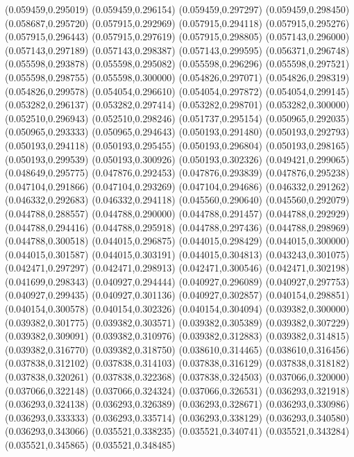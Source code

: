 (0.059459,0.295019)
(0.059459,0.296154)
(0.059459,0.297297)
(0.059459,0.298450)
(0.058687,0.295720)
(0.057915,0.292969)
(0.057915,0.294118)
(0.057915,0.295276)
(0.057915,0.296443)
(0.057915,0.297619)
(0.057915,0.298805)
(0.057143,0.296000)
(0.057143,0.297189)
(0.057143,0.298387)
(0.057143,0.299595)
(0.056371,0.296748)
(0.055598,0.293878)
(0.055598,0.295082)
(0.055598,0.296296)
(0.055598,0.297521)
(0.055598,0.298755)
(0.055598,0.300000)
(0.054826,0.297071)
(0.054826,0.298319)
(0.054826,0.299578)
(0.054054,0.296610)
(0.054054,0.297872)
(0.054054,0.299145)
(0.053282,0.296137)
(0.053282,0.297414)
(0.053282,0.298701)
(0.053282,0.300000)
(0.052510,0.296943)
(0.052510,0.298246)
(0.051737,0.295154)
(0.050965,0.292035)
(0.050965,0.293333)
(0.050965,0.294643)
(0.050193,0.291480)
(0.050193,0.292793)
(0.050193,0.294118)
(0.050193,0.295455)
(0.050193,0.296804)
(0.050193,0.298165)
(0.050193,0.299539)
(0.050193,0.300926)
(0.050193,0.302326)
(0.049421,0.299065)
(0.048649,0.295775)
(0.047876,0.292453)
(0.047876,0.293839)
(0.047876,0.295238)
(0.047104,0.291866)
(0.047104,0.293269)
(0.047104,0.294686)
(0.046332,0.291262)
(0.046332,0.292683)
(0.046332,0.294118)
(0.045560,0.290640)
(0.045560,0.292079)
(0.044788,0.288557)
(0.044788,0.290000)
(0.044788,0.291457)
(0.044788,0.292929)
(0.044788,0.294416)
(0.044788,0.295918)
(0.044788,0.297436)
(0.044788,0.298969)
(0.044788,0.300518)
(0.044015,0.296875)
(0.044015,0.298429)
(0.044015,0.300000)
(0.044015,0.301587)
(0.044015,0.303191)
(0.044015,0.304813)
(0.043243,0.301075)
(0.042471,0.297297)
(0.042471,0.298913)
(0.042471,0.300546)
(0.042471,0.302198)
(0.041699,0.298343)
(0.040927,0.294444)
(0.040927,0.296089)
(0.040927,0.297753)
(0.040927,0.299435)
(0.040927,0.301136)
(0.040927,0.302857)
(0.040154,0.298851)
(0.040154,0.300578)
(0.040154,0.302326)
(0.040154,0.304094)
(0.039382,0.300000)
(0.039382,0.301775)
(0.039382,0.303571)
(0.039382,0.305389)
(0.039382,0.307229)
(0.039382,0.309091)
(0.039382,0.310976)
(0.039382,0.312883)
(0.039382,0.314815)
(0.039382,0.316770)
(0.039382,0.318750)
(0.038610,0.314465)
(0.038610,0.316456)
(0.037838,0.312102)
(0.037838,0.314103)
(0.037838,0.316129)
(0.037838,0.318182)
(0.037838,0.320261)
(0.037838,0.322368)
(0.037838,0.324503)
(0.037066,0.320000)
(0.037066,0.322148)
(0.037066,0.324324)
(0.037066,0.326531)
(0.036293,0.321918)
(0.036293,0.324138)
(0.036293,0.326389)
(0.036293,0.328671)
(0.036293,0.330986)
(0.036293,0.333333)
(0.036293,0.335714)
(0.036293,0.338129)
(0.036293,0.340580)
(0.036293,0.343066)
(0.035521,0.338235)
(0.035521,0.340741)
(0.035521,0.343284)
(0.035521,0.345865)
(0.035521,0.348485)
